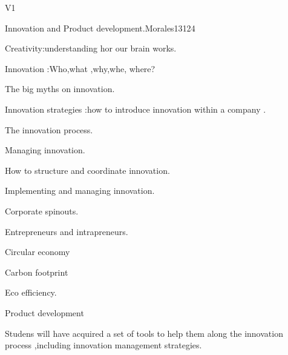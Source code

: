 \begin{syllabus}
\begin{competences}{V1}
    \item {}
    \item {}
    \item {}
    \item {}
\end{competences}

\begin{unit}{Innovation and Product development.}{}{Morales13}{12}{4}
   \begin{topics}
      \item Creativity:understanding hor our brain works.
      \item Innovation :Who,what ,why,whe, where?
      \item The big myths on innovation.
      \item Innovation strategies :how to introduce innovation within a company .
      \item The innovation process.
      \item Managing innovation.
      \item How to structure and coordinate innovation.
      \item Implementing and managing innovation.
      \item Corporate spinouts.
      \item Entrepreneurs and intrapreneurs.
      \item Circular economy
      \item Carbon footprint
      \item Eco efficiency.
      \item Product development 
      
   \end{topics}
   \begin{learningoutcomes}
      \item Studens will have  acquired a set of tools to help them along the innovation process ,including innovation management strategies.
   \end{learningoutcomes}
\end{unit}

\begin{coursebibliography}
\end{coursebibliography}

\end{syllabus}
